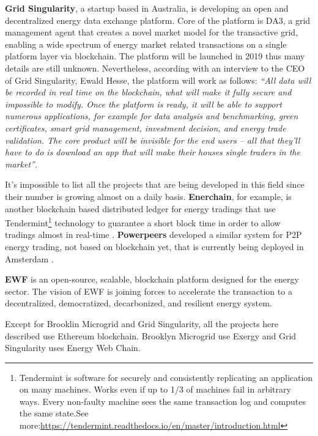 \textbf{Grid Singularity}, a startup based in Australia, is developing an open and decentralized energy data exchange platform. Core of the platform is DA3,  a grid management agent that creates a novel market model for the transactive grid, enabling a wide spectrum of energy market related transactions on a single platform layer via blockchain. The platform will be launched in 2019 thus many details are still unknown. Nevertheless, according with an interview to the CEO of Grid Singularity, Ewald Hesse, the platform will work as follows:
\textit{“All data will be recorded in real time on the blockchain, what will make it fully secure and impossible to modify. Once the platform is ready, it will be able to support numerous applications, for example for data analysis and benchmarking, green certificates, smart grid management, investment decision, and energy trade validation. The core product will be invisible for the end users – all that they’ll have to do is download an app that will make their houses single traders in the market”}\cite{gridsingularity}.  	



It’s impossible to list all the projects that are being developed in this field since their number is growing almost on a daily basis. \textbf{Enerchain}, for example, is another blockchain based distributed ledger for energy tradings that use Tendermint\footnote{Tendermint is software for securely and consistently replicating an application on many machines. Works even if up to 1/3 of machines fail in arbitrary ways. Every non-faulty machine sees the same transaction log and computes the same state.See more:\url{https://tendermint.readthedocs.io/en/master/introduction.html}
} technology to guarantee a short block time in order to allow tradings almost in real-time \cite{enerchain}. \textbf{Powerpeers} developed a similar system for P2P energy trading, not based on blockchain yet, that is currently being deployed in Amsterdam \cite{powerpeers}. 



\textbf{\ac{EWF}} is an open-source, scalable, blockchain platform designed for the energy sector. The vision of \ac{EWF} is joining forces to accelerate the transaction to a decentralized, democratized, decarbonized, and resilient energy system. 
	
	
	
Except for Brooklin Microgrid and Grid Singularity, all the projects here described use Ethereum blockchain. Brooklyn Microgrid use Exergy and Grid Singularity uses Energy Web Chain.


